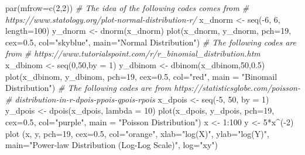 \documentclass[
]{krantz}
\makeatletter
\newenvironment{Shaded}{\begin{snugshade}}{\end{snugshade}}
\newcommand{\AttributeTok}[1]{\textcolor[rgb]{0.61,0.61,0.61}{#1}}
\newcommand{\CommentTok}[1]{\textcolor[rgb]{0.37,0.37,0.37}{\textit{#1}}}
\newcommand{\DecValTok}[1]{\textcolor[rgb]{0.06,0.06,0.06}{#1}}
\newcommand{\FloatTok}[1]{\textcolor[rgb]{0.06,0.06,0.06}{#1}}
\newcommand{\FunctionTok}[1]{\textcolor[rgb]{0,0,0}{#1}}
\newcommand{\NormalTok}[1]{#1}
\newcommand{\OtherTok}[1]{\textcolor[rgb]{0.37,0.37,0.37}{#1}}
\newcommand{\SpecialCharTok}[1]{\textcolor[rgb]{0,0,0}{#1}}
\newcommand{\StringTok}[1]{\textcolor[rgb]{0.5,0.5,0.5}{#1}}
\newenvironment{kframe}{%
\medskip{}
\setlength{\fboxsep}{.8em}
 \def\at@end@of@kframe{}%
 \ifinner\ifhmode%
  \def\at@end@of@kframe{\end{minipage}}%
  \begin{minipage}{\columnwidth}%
 \fi\fi%
 \def\FrameCommand##1{\hskip\@totalleftmargin \hskip-\fboxsep
 \colorbox{shadecolor}{##1}\hskip-\fboxsep
     \hskip-\linewidth \hskip-\@totalleftmargin \hskip\columnwidth}%
 \MakeFramed {\advance\hsize-\width
   \@totalleftmargin\z@ \linewidth\hsize
   \@setminipage}}%
 {\par\unskip\endMakeFramed%
 \at@end@of@kframe}
\renewenvironment{Shaded}{\begin{kframe}}{\end{kframe}}
\makeatother
\begin{document}
\begin{Shaded}
\begin{Highlighting}[]
\FunctionTok{par}\NormalTok{(}\AttributeTok{mfrow=}\FunctionTok{c}\NormalTok{(}\DecValTok{2}\NormalTok{,}\DecValTok{2}\NormalTok{))}
\CommentTok{\# The idea of the following codes comes from}
\CommentTok{\# https://www.statology.org/plot{-}normal{-}distribution{-}r/}
\NormalTok{x\_dnorm }\OtherTok{\textless{}{-}} \FunctionTok{seq}\NormalTok{(}\SpecialCharTok{{-}}\DecValTok{6}\NormalTok{, }\DecValTok{6}\NormalTok{, }\AttributeTok{length=}\DecValTok{100}\NormalTok{)}
\NormalTok{y\_dnorm }\OtherTok{\textless{}{-}} \FunctionTok{dnorm}\NormalTok{(x\_dnorm)}
\FunctionTok{plot}\NormalTok{(x\_dnorm, y\_dnorm, }\AttributeTok{pch=}\DecValTok{19}\NormalTok{, }\AttributeTok{cex=}\FloatTok{0.5}\NormalTok{, }\AttributeTok{col=}\StringTok{"skyblue"}\NormalTok{,}
     \AttributeTok{main=}\StringTok{"Normal Distribution"}\NormalTok{)}
\CommentTok{\# The following codes are from }
\CommentTok{\# https://www.tutorialspoint.com/r/r\_binomial\_distribution.htm}
\NormalTok{x\_dbinom }\OtherTok{\textless{}{-}} \FunctionTok{seq}\NormalTok{(}\DecValTok{0}\NormalTok{,}\DecValTok{50}\NormalTok{,}\AttributeTok{by =} \DecValTok{1}\NormalTok{)}
\NormalTok{y\_dbinom }\OtherTok{\textless{}{-}} \FunctionTok{dbinom}\NormalTok{(x\_dbinom,}\DecValTok{50}\NormalTok{,}\FloatTok{0.5}\NormalTok{)}
\FunctionTok{plot}\NormalTok{(x\_dbinom, y\_dbinom, }\AttributeTok{pch=}\DecValTok{19}\NormalTok{, }\AttributeTok{cex=}\FloatTok{0.5}\NormalTok{, }\AttributeTok{col=}\StringTok{"red"}\NormalTok{,}
     \AttributeTok{main =} \StringTok{"Binomail Distribution"}\NormalTok{)}
\CommentTok{\# The following codes are from https://statisticsglobe.com/poisson{-}}
\CommentTok{\# distribution{-}in{-}r{-}dpois{-}ppois{-}qpois{-}rpois}
\NormalTok{x\_dpois }\OtherTok{\textless{}{-}} \FunctionTok{seq}\NormalTok{(}\SpecialCharTok{{-}}\DecValTok{5}\NormalTok{, }\DecValTok{50}\NormalTok{, }\AttributeTok{by =} \DecValTok{1}\NormalTok{)}
\NormalTok{y\_dpois }\OtherTok{\textless{}{-}} \FunctionTok{dpois}\NormalTok{(x\_dpois, }\AttributeTok{lambda =} \DecValTok{10}\NormalTok{)}
\FunctionTok{plot}\NormalTok{(x\_dpois, y\_dpois, }\AttributeTok{pch=}\DecValTok{19}\NormalTok{, }\AttributeTok{cex=}\FloatTok{0.5}\NormalTok{, }\AttributeTok{col=}\StringTok{"purple"}\NormalTok{,}
     \AttributeTok{main =} \StringTok{"Poisson Distribution"}\NormalTok{)}
\NormalTok{x }\OtherTok{\textless{}{-}} \DecValTok{1}\SpecialCharTok{:}\DecValTok{100}
\NormalTok{y }\OtherTok{\textless{}{-}} \DecValTok{5}\SpecialCharTok{*}\NormalTok{x}\SpecialCharTok{\^{}}\NormalTok{(}\SpecialCharTok{{-}}\DecValTok{2}\NormalTok{)}
\FunctionTok{plot}\NormalTok{ (x, y, }\AttributeTok{pch=}\DecValTok{19}\NormalTok{, }\AttributeTok{cex=}\FloatTok{0.5}\NormalTok{, }\AttributeTok{col=}\StringTok{"orange"}\NormalTok{,}
      \AttributeTok{xlab=}\StringTok{"log(X)"}\NormalTok{, }\AttributeTok{ylab=}\StringTok{"log(Y)"}\NormalTok{,}
      \AttributeTok{main=}\StringTok{"Power{-}law Distribution (Log{-}Log Scale)"}\NormalTok{,}
      \AttributeTok{log=}\StringTok{"xy"}\NormalTok{)}
\end{Highlighting}
\end{Shaded}
\end{document}
